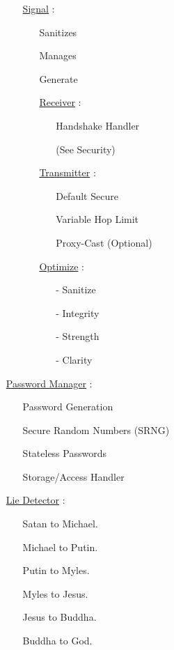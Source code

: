\documentclass[11pt]{article}
\begin{document}
\begin{enumerate}
\begin{enumerate}
		\item[] \ul{Signal} :
		\begin{enumerate}
			\item[] Sanitizes
			\item[] Manages
			\item[] Generate
			
			\item[] \ul{Receiver}  :
			\begin{enumerate}
				\item[] Handshake Handler
				\item[] (See Security)
			\end{enumerate}
			
			\item[] \ul{Transmitter}  :
			\begin{enumerate}
				\item[] Default Secure
				\item[] Variable Hop Limit
				\item[] Proxy-Cast (Optional)
			\end{enumerate}
		
			\item[] \ul{Optimize} :
			\begin{enumerate}
				\item[-] Sanitize
				\item[-] Integrity
				\item[-] Strength
				\item[-] Clarity
			\end{enumerate}
		\end{enumerate}
	\end{enumerate}

	\item[] \ul{Password Manager} :
	\begin{enumerate}
		\item[] Password Generation
		\item[] Secure Random Numbers (SRNG)
		\item[] Stateless Passwords
		\item[] Storage/Access Handler
	\end{enumerate}

	\item[] \ul{Lie Detector} :
	\begin{enumerate}
		\item[] Satan to Michael.
		\item[] Michael to Putin.
		\item[] Putin to Myles.
		\item[] Myles to Jesus.
		\item[] Jesus to Buddha.
		\item[] Buddha to God.
	\end{enumerate}


\end{enumerate}
\end{document}
